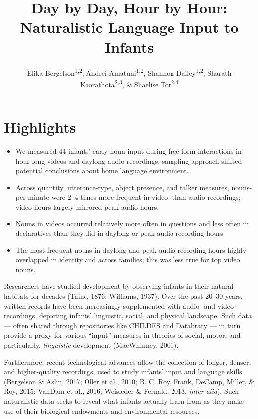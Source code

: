 \documentclass[man]{apa6}
\title{Day by Day, Hour by Hour: Naturalistic Language Input to Infants}
\author{Elika Bergelson\textsuperscript{1,2}, Andrei Amatuni\textsuperscript{1,2}, Shannon Dailey\textsuperscript{1,2}, Sharath Koorathota\textsuperscript{2,3}, \& Shaelise Tor\textsuperscript{2,4}}
\affiliation{
    \vspace{0.5cm}
          \textsuperscript{1} Duke University\\
          \textsuperscript{2} University of Rochester\\
          \textsuperscript{3} Columbia University Medical Center\\
          \textsuperscript{4} Syracuse University  }
\providecommand{\tightlist}{%
  \setlength{\itemsep}{0pt}\setlength{\parskip}{0pt}}
\theoremstyle{definition}
\theoremstyle{definition}
\theoremstyle{definition}
\theoremstyle{remark}
\begin{document}
\maketitle

\setcounter{secnumdepth}{0}



\section{Highlights}\label{highlights}

\begin{itemize}
\tightlist
\item
  We measured 44 infants' early noun input during free-form interactions
  in hour-long videos and daylong audio-recordings; sampling approach
  shifted potential conclusions about home language environment.
\item
  Across quantity, utterance-type, object presence, and talker measures,
  nouns-per-minute were 2--4 times more frequent in video- than
  audio-recordings; video hours largely mirrored peak audio hours.
\item
  Nouns in videos occurred relatively more often in questions and less
  often in declaratives than they did in daylong or peak audio-recording
  hours
\item
  The most frequent nouns in daylong and peak audio-recording hours
  highly overlapped in identity and across families; this was less true
  for top video nouns.
\end{itemize}

Researchers have studied development by observing infants in their
natural habitats for decades (Taine, 1876; Williams, 1937). Over the
past 20--30 years, written records have been increasingly supplemented
with audio- and video-recordings, depicting infants' linguistic, social,
and physical landscape. Such data --- often shared through repositories
like CHILDES and Databrary --- in turn provide a proxy for various
\enquote{input} measures in theories of social, motor, and particularly,
\emph{linguistic} development (MacWhinney, 2001).

Furthermore, recent technological advances allow the collection of
longer, denser, and higher-quality recordings, used to study infants'
input and language skills (Bergelson \& Aslin, 2017; Oller et al., 2010;
B. C. Roy, Frank, DeCamp, Miller, \& Roy, 2015; VanDam et al., 2016;
Weisleder \& Fernald, 2013, \emph{inter alia}). Such naturalistic data
seeks to reveal what infants actually learn from as they make use of
their biological endowments and environmental resources.
\end{document}
